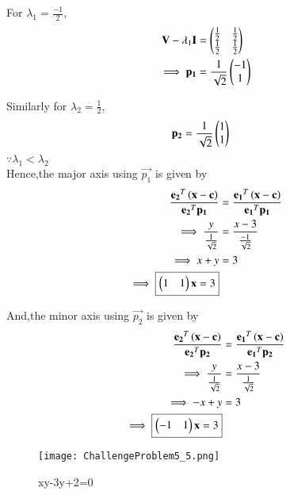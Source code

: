 \documentclass[journal,12pt,twocolumn]{IEEEtran}
\begin{document}
\begin{enumerate}
    For $\lambda_1=\frac{-1}{2}$,
    \begin{align}
        \mathbf{V}-\lambda_1\mathbf{I} &= \begin{pmatrix}\frac{1}{2} & \frac{1}{2} \\ \frac{1}{2} & \frac{1}{2}\end{pmatrix} \\
        \implies \mathbf{p_1} &= \frac{1}{\sqrt{2}}\begin{pmatrix}-1 \\ 1\end{pmatrix}
    \end{align}
    
    Similarly for $\lambda_2=\frac{1}{2}$,
    \begin{align}
        \mathbf{p_2} &= \frac{1}{\sqrt{2}}\begin{pmatrix}1 \\ 1\end{pmatrix}
    \end{align}
    $\because \lambda_1<\lambda_2$ \\
    Hence,the major axis using $\vec{p_1}$ is given by
    \begin{align}
        \frac{\mathbf{e_2}^T\left(\mathbf{x}-\mathbf{c}\right)}{{\mathbf{e_2}^T\mathbf{p_1}}} &= \frac{\mathbf{e_1}^T\left(\mathbf{x}-\mathbf{c}\right)}{{\mathbf{e_1}^T\mathbf{p_1}}}\\
        \implies \frac{y}{\frac{1}{\sqrt{2}}} &= \frac{x-3}{\frac{-1}{\sqrt{2}}} \\
        \implies x+y &= 3\\
        \implies \boxed{\begin{pmatrix}1 & 1\end{pmatrix}\mathbf{x} = 3}
    \end{align}
    
    And,the minor axis using $\vec{p_2}$ is given by
    \begin{align}
        \frac{\mathbf{e_2}^T\left(\mathbf{x}-\mathbf{c}\right)}{{\mathbf{e_2}^T\mathbf{p_2}}} &= \frac{\mathbf{e_1}^T\left(\mathbf{x}-\mathbf{c}\right)}{{\mathbf{e_1}^T\mathbf{p_2}}}\\
        \implies \frac{y}{\frac{1}{\sqrt{2}}} &= \frac{x-3}{\frac{1}{\sqrt{2}}} \\
        \implies -x+y &= 3 \\
        \implies \boxed{\begin{pmatrix}-1 & 1\end{pmatrix}\mathbf{x} = 3}
    \end{align}
   
    \begin{figure}[!ht]
    \centering
    \texttt{[image: ChallengeProblem5\_5.png]}
    \caption{xy-3y+2=0}
    \label{ex5}	
    \end{figure}
    
\end{enumerate}
\end{document}
